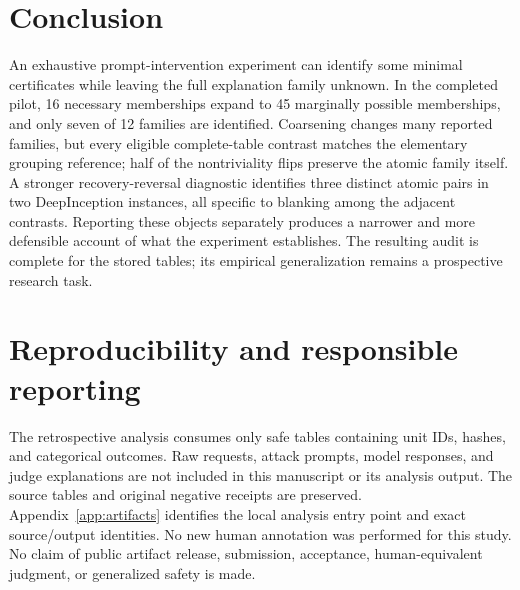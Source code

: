 \documentclass{article}
\begin{document}
\section{Conclusion}

An exhaustive prompt-intervention experiment can identify some minimal
certificates while leaving the full explanation family unknown. In the
completed pilot, 16 necessary memberships expand to 45 marginally possible
memberships, and only seven of 12 families are identified. Coarsening changes
many reported families, but every eligible complete-table contrast matches
the elementary grouping reference; half of the nontriviality flips preserve
the atomic family itself. A stronger recovery-reversal diagnostic identifies
three distinct atomic pairs in two DeepInception instances, all specific to
blanking among the adjacent contrasts. Reporting these
objects separately produces a narrower and more defensible account of what
the experiment establishes. The resulting audit is complete for the stored
tables; its empirical generalization remains a prospective research task.

\section*{Reproducibility and responsible reporting}

The retrospective analysis consumes only safe tables containing unit IDs,
hashes, and categorical outcomes. Raw requests, attack prompts, model
responses, and judge explanations are not included in this manuscript or
its analysis output. The source tables and original negative receipts are
preserved. Appendix~\ref{app:artifacts} identifies the local analysis entry
point and exact source/output identities. No new human annotation was
performed for this study. No claim of public artifact release, submission,
acceptance, human-equivalent judgment, or generalized safety is made.
\end{document}

